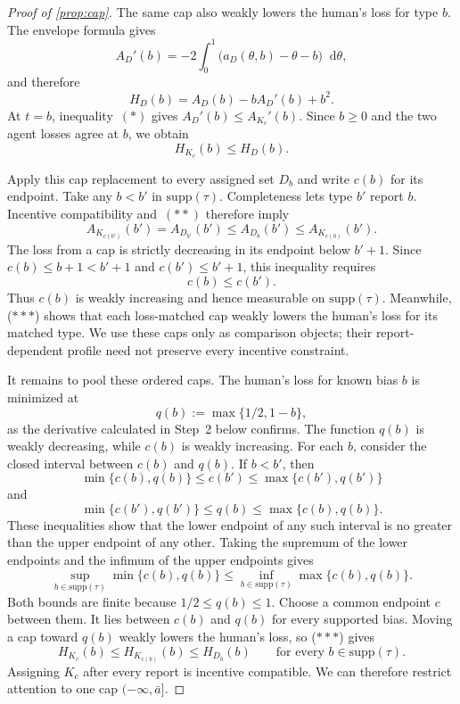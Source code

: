 \documentclass[12pt,reqno]{article}
\newcommand{\de}{\mathop{}\!\mathrm{d}}
\newcommand{\supp}{\mathrm{supp}}
\theoremstyle{definition} \newtheorem{example}{Example}
\theoremstyle{definition} \newtheorem{condition}{Condition}
\theoremstyle{definition} \newtheorem{corollary}{Corollary}
\theoremstyle{definition} \newtheorem{claim}{Claim}
\theoremstyle{definition} \newtheorem{definition}{Definition}
\theoremstyle{definition} \newtheorem{conjecture}{Conjecture}
\theoremstyle{definition} \newtheorem{Lemma}{Lemma}
\theoremstyle{definition} \newtheorem{lemma}{Lemma}
\theoremstyle{plain} \newtheorem{theorem}{Theorem}
\theoremstyle{definition} \newtheorem{assumption}{Assumption}
\theoremstyle{definition} \newtheorem*{assumptionnonumber}{Assumption}
\theoremstyle{definition} \newtheorem*{theoremNoNumber}{Proposition}
\theoremstyle{definition}\newtheorem{proposition}{Proposition}
\theoremstyle{definition} \newtheorem{observation}{Observation}
\theoremstyle{definition} \newtheorem*{definitionNoNumber}{Definition}
\theoremstyle{definition} \newtheorem{Definition}{Definition}
\theoremstyle{definition} \newtheorem*{DefinitionNoNumber}{Definition}
\theoremstyle{definition} \newtheorem*{fact}{Fact}
\theoremstyle{definition} \newtheorem*{property}{Property}
\theoremstyle{definition} \newtheorem{remark}{Remark}
\theoremstyle{definition}\newtheorem{romanexampleinner}{Example}
\begin{document}
\begin{proof}[Proof of \cref{prop:cap}]
The same cap also weakly lowers the human's loss for type $b$. The envelope formula gives
\[
A_D'(b)
=-2\int_0^1\bigl(a_D(\theta,b)-\theta-b\bigr)\de\theta,
\]
and therefore
\[
H_D(b)=A_D(b)-bA_D'(b)+b^2.
\]
At $t=b$, inequality~$(*)$ gives $A_D'(b)\leq A_{K_c}'(b)$. Since $b\geq0$ and the two agent losses agree at $b$, we obtain
\[
H_{K_c}(b)\leq H_D(b). \tag{***} \label{eq:triplestar}
\]

Apply this cap replacement to every assigned set $D_b$ and write $c(b)$ for its endpoint. Take any $b<b'$ in $\supp(\tau)$. Completeness lets type $b'$ report $b$. Incentive compatibility and~$(**)$ therefore imply
\[
A_{K_{c(b')}}(b')
=A_{D_{b'}}(b')
\leq A_{D_b}(b')
\leq A_{K_{c(b)}}(b').
\]
The loss from a cap is strictly decreasing in its endpoint below $b'+1$. Since $c(b)\leq b+1<b'+1$ and $c(b')\leq b'+1$, this inequality requires
\[
c(b)\leq c(b').
\]
Thus $c(b)$ is weakly increasing and hence measurable on $\supp(\tau)$. Meanwhile, ($***$) shows that each loss-matched cap weakly lowers the human's loss for its matched type. We use these caps only as comparison objects; their report-dependent profile need not preserve every incentive constraint.

It remains to pool these ordered caps. The human's loss for known bias $b$ is minimized at
\[
q(b):=\max\{1/2,1-b\},
\]
as the derivative calculated in Step~2 below confirms. The function $q(b)$ is weakly decreasing, while $c(b)$ is weakly increasing. For each $b$, consider the closed interval between $c(b)$ and $q(b)$. If $b<b'$, then
\[
\min\{c(b),q(b)\}
\leq c(b')
\leq\max\{c(b'),q(b')\}
\]
and
\[
\min\{c(b'),q(b')\}
\leq q(b)
\leq\max\{c(b),q(b)\}.
\]
These inequalities show that the lower endpoint of any such interval is no greater than the upper endpoint of any other. Taking the supremum of the lower endpoints and the infimum of the upper endpoints gives
\[
\sup_{b\in\supp(\tau)}\min\{c(b),q(b)\}
\leq
\inf_{b\in\supp(\tau)}\max\{c(b),q(b)\}.
\]
Both bounds are finite because $1/2\leq q(b)\leq1$. Choose a common endpoint $c$ between them. It lies between $c(b)$ and $q(b)$ for every supported bias. Moving a cap toward $q(b)$ weakly lowers the human's loss, so ($***$) gives
\[
H_{K_c}(b)
\leq H_{K_{c(b)}}(b)
\leq H_{D_b}(b)
\qquad\text{for every }b\in\supp(\tau).
\]
Assigning $K_c$ after every report is incentive compatible. We can therefore restrict attention to one cap $(-\infty,\bar a]$.


\end{proof}
\end{document}
